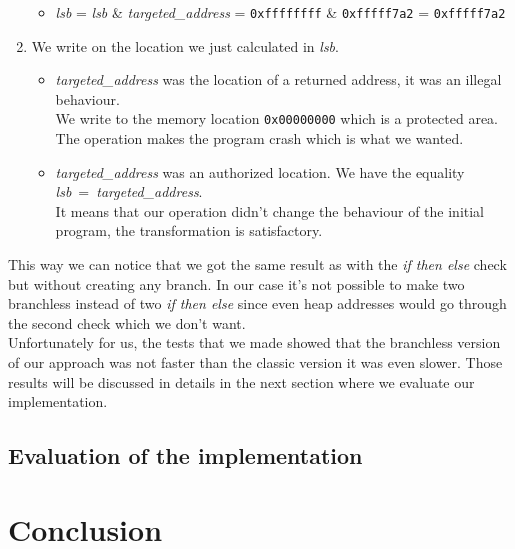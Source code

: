 \documentclass[11pt]{sdm}
\begin{document}
\begin{enumerate}
\begin{itemize}
			\item \textit{lsb} = \textit{lsb} \& \textit{targeted\_address} = \texttt{0xffffffff} \& \texttt{0xfffff7a2} = \texttt{0xfffff7a2}
		\end{itemize}
	\item We write on the location we just calculated in \textit{lsb}.
		\begin{itemize}
			\item \textit{targeted\_address} was the location of a returned address, it was an illegal behaviour.\\
			We write to the memory location \texttt{0x00000000} which is a protected area. The operation makes the program crash which is what we wanted.
			\item \textit{targeted\_address} was an authorized location. We have the equality \textit{lsb}~=~\textit{targeted\_address}.\\
				It means that our operation didn't change the behaviour of the initial program, the transformation is satisfactory.				
		\end{itemize}
\end{enumerate}

This way we can notice that we got the same result as with the \textit{if then else} check but without creating any branch. In our case it's not possible to make two branchless instead of two \textit{if then else} since even heap addresses would go through the second check which we don't want. \\
Unfortunately for us, the tests that we made showed that the branchless version of our approach was not faster than the classic version it was even slower. Those results will be discussed in details in the next section where we evaluate our implementation.
\subsection{Evaluation of the implementation}
\label{sub:evaluation_of_implem}

\section{Conclusion}
\label{sec:Conclusion}
\end{document}
